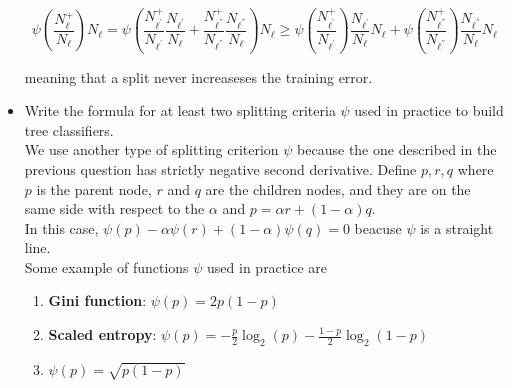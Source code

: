 \begin{itemize}
    $$
    \psi \left( \frac{N_{\ell}^+}{N_{\ell}}\right){N_{\ell}} = \psi \left( \frac{N_{\ell^{'}}^+}{N_{\ell^{'}}}\frac{N_{\ell^{'}}}{N_{\ell}} + \frac{N_{\ell^{''}}^+}{N_{\ell^{''}}}\frac{N_{\ell^{''}}}{N_{\ell}}\right){N_{\ell}} \geq \psi\left( \frac{N_{\ell^{'}}^+}{N_{\ell^{'}}}\right)\frac{N_{\ell^{'}}}{N_{\ell}}N_{\ell} + \psi\left( \frac{N_{\ell^{''}}^+}{N_{\ell^{''}}}\right)\frac{N_{\ell^{''}}}{N_{\ell}}N_{\ell}
    $$

    meaning that a split never increaseses the training error.\\

    \item Write the formula for at least two splitting criteria $\psi$ used in practice to build tree classifiers.\\ 
        
        We use another type of splitting criterion $\psi$ because the one described in the previous question has strictly negative second derivative. Define $p, r, q$ where $p$ is the parent node, $r$ and $q$ are the children nodes, and they are on the same side with respect to the $\alpha$ and $p = \alpha r + (1 - \alpha)q$.\\
        In this case, $\psi(p) - \alpha\psi(r) + (1 - \alpha)\psi(q) = 0$ beacuse $\psi$ is a straight line.\\

        Some example of functions $\psi$ used in practice are 
        \begin{enumerate}
            \item \textbf{Gini function}: $\psi(p) = 2p(1-p)$
            \item \textbf{Scaled entropy}: $\psi(p) = -\frac{p}{2}\log_2(p) - \frac{1-p}{2}\log_2(1-p)$
            \item $\psi(p) = \sqrt{p(1-p)}$
        \end{enumerate}
\end{itemize}
